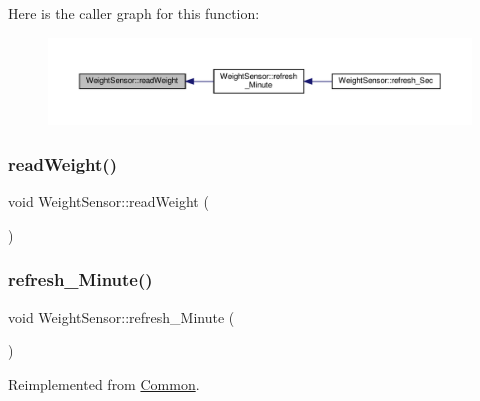 Here is the caller graph for this function\+:
\nopagebreak
\begin{figure}[H]
\begin{center}
\leavevmode
\includegraphics[width=350pt]{class_weight_sensor_ac4a6f05281cc7fa0c602e2f0b2efdbaa_icgraph}
\end{center}
\end{figure}
\mbox{\label{class_weight_sensor_ac4a6f05281cc7fa0c602e2f0b2efdbaa}} 
\subsubsection{\texorpdfstring{read\+Weight()}{readWeight()}\hspace{0.1cm}{\footnotesize\ttfamily [2/2]}}
{\footnotesize\ttfamily void Weight\+Sensor\+::read\+Weight (\begin{DoxyParamCaption}{ }\end{DoxyParamCaption})}

\mbox{\label{class_weight_sensor_a3d0d70823fc37a32d8320189d15d448d}} 
\subsubsection{\texorpdfstring{refresh\+\_\+\+Minute()}{refresh\_Minute()}\hspace{0.1cm}{\footnotesize\ttfamily [1/2]}}
{\footnotesize\ttfamily void Weight\+Sensor\+::refresh\+\_\+\+Minute (\begin{DoxyParamCaption}{ }\end{DoxyParamCaption})\hspace{0.3cm}{\ttfamily [virtual]}}



Reimplemented from \hyperlink{class_common_a14e4462a94bd118028ce1d487ca0292c}{Common}.



